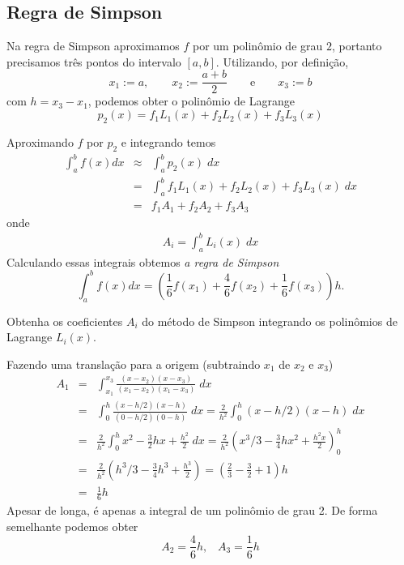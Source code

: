 \subsection{Regra de Simpson}
Na regra de Simpson aproximamos $f$ por um polinômio de grau $2$, portanto precisamos três pontos do intervalo $[a,b]$. Utilizando, por definição,
$$
x_1:=a,\qquad x_2:=\frac{a+b}{2}\qquad \text{e}\qquad x_3:=b
$$
com $h=x_3-x_1$, podemos obter o polinômio de Lagrange 
\begin{equation*}
    p_2(x) = f_1L_1(x) + f_2L_2(x)  + f_3L_3(x)
\end{equation*}

Aproximando $f$ por $p_2$ e integrando temos
\begin{eqnarray}
\int_a^bf(x)dx &\approx&\int_a^b p_2(x) \;dx \\ 
               &=&\int_a^b f_1L_1(x) + f_2L_2(x)  + f_3L_3(x) \;dx \\  
               &=&f_1 A_1 + f_2A_2  + f_3A_3  
\end{eqnarray}
onde
\begin{eqnarray}
  A_i = \int_a^b L_i(x) \;dx  
\end{eqnarray}
Calculando essas integrais obtemos \emph{a regra de Simpson}
$$
\int_a^bf(x)dx=\left(\frac{1}{6}f(x_1)+\frac{4}{6}f(x_2)+\frac{1}{6}f(x_3)\right)h.
$$

\begin{ex}
Obtenha os coeficientes $A_i$ do método de Simpson  integrando os polinômios de Lagrange $L_i(x)$.

Fazendo uma translação para a origem (subtraindo $x_1$ de $x_2$ e $x_3$)
\begin{eqnarray*}
   A_1 &=& \int_{x_1}^{x_3} \frac{(x-x_2)(x-x_3)}{(x_1-x_2)(x_1-x_3)}\;dx \\
       &=& \int_0^h \frac{(x-h/2)(x-h)}{(0-h/2)(0-h)}\;dx 
        =  \frac{2}{h^2} \int_0^h (x-h/2)(x-h)\;dx \\
       &=& \frac{2}{h^2} \int_0^h x^2 -\frac{3}{2}hx+\frac{h^2}{2}\;dx 
        =  \frac{2}{h^2} (x^3/3 -\frac{3}{4}hx^2+\frac{h^2x}{2})_0^h \\  
       &=& \frac{2}{h^2} (h^3/3 -\frac{3}{4}h^3+\frac{h^3}{2})   
        =  (\frac{2}{3}-\frac{3}{2}+1)h\\
       &=& \frac{1}{6}h
\end{eqnarray*}
Apesar de longa, é apenas a integral de um polinômio de grau 2. De forma semelhante podemos obter
$$
A_2 = \frac{4}{6}h, \;\;\; A_3 = \frac{1}{6}h
$$
\end{ex}




